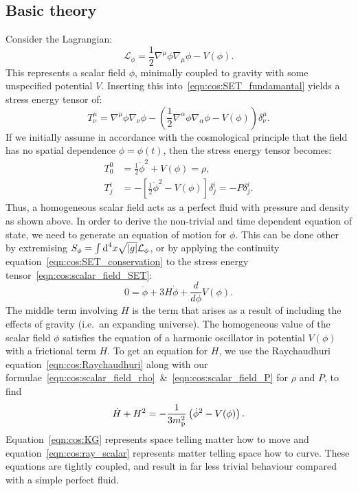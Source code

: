 \subsection{Basic theory}
Consider the Lagrangian:
\begin{equation}
  \mathcal{L}_\phi = \frac{1}{2}\nabla^\mu\phi\nabla_\mu\phi - V(\phi).
  \label{eqn:cos:scalar_field_lagrangian}
\end{equation}
This represents a scalar field $\phi$, minimally coupled to gravity with some unspecified potential $V$.  Inserting this into~\eqref{eqn:cos:SET_fundamantal} yields a stress energy tensor of:
\begin{equation}
  T^{\mu}_{\nu} = \nabla^\mu\phi\nabla_\nu\phi - \left( \frac{1}{2}\nabla^\alpha\phi \nabla_\alpha\phi - V(\phi)  \right)\delta^{\mu}_{\nu}.
  \label{eqn:cos:scalar_field_SET}
\end{equation}
If we initially assume in accordance with the cosmological principle that the field has no spatial dependence $\phi = \phi(t)$, then the stress energy tensor becomes:
\begin{align}
  T^{0}_{0} &=\frac{1}{2}\dot\phi^2 + V(\phi) = \rho,
  \label{eqn:cos:scalar_field_rho}\\
  T^{i}_{j} &=-\left[ \frac{1}{2}\dot\phi^2 - V(\phi)\right]\delta^{i}_{j} = -P\delta^{i}_{j}.
  \label{eqn:cos:scalar_field_P}
\end{align}
Thus, a homogeneous scalar field acts as a perfect fluid with pressure and density as shown above. In order to derive the non-trivial and time dependent equation of state, we need to generate an equation of motion for $\phi$. This can be done other by extremising $S_\phi = \int \d[4]{x} \sqrt{|g|} \mathcal{L}_\phi$, or by applying the continuity equation~\eqref{eqn:cos:SET_conservation} to the stress energy tensor~\eqref{eqn:cos:scalar_field_SET}: 
\begin{equation}
  0 = \ddot{\phi} + 3 H \dot{\phi} + \frac{d}{d\phi}V(\phi).
  \label{eqn:cos:KG}
\end{equation}
The middle term involving $H$ is the term that arises as a result of including the effects of gravity (i.e.\ an expanding universe). The homogeneous value of the scalar field $\phi$ satisfies the equation of a harmonic oscillator in potential $V(\phi)$ with a frictional term $H$.
To get an equation for $H$, we use the Raychaudhuri equation~\eqref{eqn:cos:Raychaudhuri} along with our formulae~\eqref{eqn:cos:scalar_field_rho}~\&~\eqref{eqn:cos:scalar_field_P} for $\rho$ and $P$, to find
\begin{equation}
  \dot{H}+H^2 = -\frac{1}{3\m^2}\left(\dot{\phi}^2-V(\phi)\right).
  \label{eqn:cos:ray_scalar}
\end{equation}
Equation~\eqref{eqn:cos:KG} represents space telling matter how to move and equation~\eqref{eqn:cos:ray_scalar} represents matter telling space how to curve. These equations are tightly coupled, and result in far less trivial behaviour compared with a simple perfect fluid.


